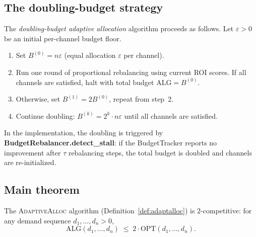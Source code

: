 \documentclass[11pt]{article}
\providecommand{\OPT}{\mathrm{OPT}}           %
\providecommand{\ALG}{\mathrm{ALG}}           %
\providecommand{\AdaptAlloc}{\textsc{AdaptiveAlloc}}   %
\begin{document}
\subsection{The doubling-budget strategy}

\begin{definition}[\AdaptAlloc{}]\label{def:adaptalloc}
The \emph{doubling-budget adaptive allocation} algorithm proceeds
as follows.  Let $\varepsilon > 0$ be an initial per-channel budget
floor.
\begin{enumerate}
  \item Set $B^{(0)} = n\varepsilon$ (equal allocation $\varepsilon$ per channel).
  \item Run one round of proportional rebalancing using current ROI
    scores.  If all channels are satisfied, halt with total budget
    $\ALG = B^{(0)}$.
  \item Otherwise, set $B^{(1)} = 2B^{(0)}$, repeat from step~2.
  \item Continue doubling: $B^{(k)} = 2^k \cdot n\varepsilon$
    until all channels are satisfied.
\end{enumerate}
\end{definition}

\begin{remark}
In the \JuGeo{} implementation, the doubling is triggered by
\textbf{BudgetRebalancer.detect\_stall}: if the BudgetTracker
reports no improvement after $\tau$ rebalancing steps, the total
budget is doubled and channels are re-initialized.
\end{remark}

\subsection{Main theorem}

\begin{theorem}\label{thm:competitive}
The \AdaptAlloc{} algorithm (Definition~\ref{def:adaptalloc}) is
$2$-competitive: for any demand sequence $d_1, \ldots, d_n > 0$,
\[
  \ALG(d_1, \ldots, d_n) \;\le\; 2 \cdot \OPT(d_1, \ldots, d_n).
\]
\end{theorem}
\end{document}
